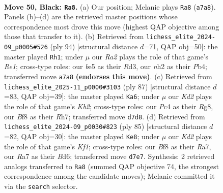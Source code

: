 \documentclass[11pt]{article}
\begin{document}
\clearpage

\begin{figure}[p]\centering
\begin{subfigure}{0.46\textwidth}\centering
\resizebox{\linewidth}{!}{%
\newchessgame
\chessboard[
  setfen={5b1r/r2k2p1/p1p5/Pp1bBp1p/2p2P1P/4P1P1/1P1K3N/R5R1 b - - 2 50},
  showmover=false,
  pgfstyle=straightmove, color=movearrow, markmove={a7-a8}
]}
\caption{}
\end{subfigure}\hfill
\begin{subfigure}{0.46\textwidth}\centering
\resizebox{\linewidth}{!}{%
\newchessgame
\chessboard[
  setfen={4r1r1/2kb1p2/4p1p1/1p1pP2p/pP3P2/P1PR2P1/4B2P/2K1R3 w - - 35 48},
  showmover=false,
  pgfstyle=straightmove, color=movearrow, markmove={e1-h1}
]}
\caption{}
\end{subfigure}
\\[4pt]
\begin{subfigure}{0.46\textwidth}\centering
\resizebox{\linewidth}{!}{%
\newchessgame
\chessboard[
  setfen={6r1/1kp4r/1p1b4/3Pp2p/2R1Pp2/pP3P2/P5PR/4BK2 b - - 14 44},
  showmover=false,
  pgfstyle=straightmove, color=movearrow, markmove={b7-a6}
]}
\caption{}
\end{subfigure}\hfill
\begin{subfigure}{0.46\textwidth}\centering
\resizebox{\linewidth}{!}{%
\newchessgame
\chessboard[
  setfen={r4k2/r4p2/3b1Pp1/2pPp1Pp/p1P4P/RP1RK2B/8/8 b - - 2 43},
  showmover=false,
  pgfstyle=straightmove, color=movearrow, markmove={f8-e8}
]}
\caption{}
\end{subfigure}
\caption{\textbf{Move 50, Black: \texttt{Ra8}.} (a) Our position; Melanie plays \texttt{Ra8} (\texttt{a7a8}). Panels (b)--(d) are the retrieved master positions whose correspondence most drove this move (highest QAP objective among those that transfer to it). (b) Retrieved from \texttt{lichess\_elite\_2024-09\_p0005\#526} (ply 94) [structural distance $d$=71, QAP obj=50]: the master played \texttt{Rh1}; under $\mu$ our \emph{Ra2} plays the role of that game's \emph{Re1}; cross-type roles: our \emph{b}e5 as their \emph{R}d3, our \emph{n}h2 as their \emph{P}b4; transferred move \texttt{a7a8} \textbf{(endorses this move)}. (c) Retrieved from \texttt{lichess\_elite\_2025-11\_p0000\#3103} (ply 87) [structural distance $d$=83, QAP obj=39]: the master played \texttt{Ka6}; under $\mu$ our \emph{Kd2} plays the role of that game's \emph{Kb2}; cross-type roles: our \emph{P}c4 as their \emph{R}g8, our \emph{B}f8 as their \emph{R}h7; transferred move \texttt{d7d8}. (d) Retrieved from \texttt{lichess\_elite\_2024-09\_p0030\#823} (ply 85) [structural distance $d$=82, QAP obj=30]: the master played \texttt{Ke8}; under $\mu$ our \emph{Kd2} plays the role of that game's \emph{Kf1}; cross-type roles: our \emph{B}f8 as their \emph{R}a7, our \emph{R}a7 as their \emph{B}d6; transferred move \texttt{d7e7}. Synthesis: 2 retrieved analogs transferred to \texttt{Ra8} (summed QAP objective 74, the strongest correspondence among the candidate moves); Melanie committed it via the \texttt{search} selector.}
\label{fig:thought-m99}
\end{figure}
\end{document}

